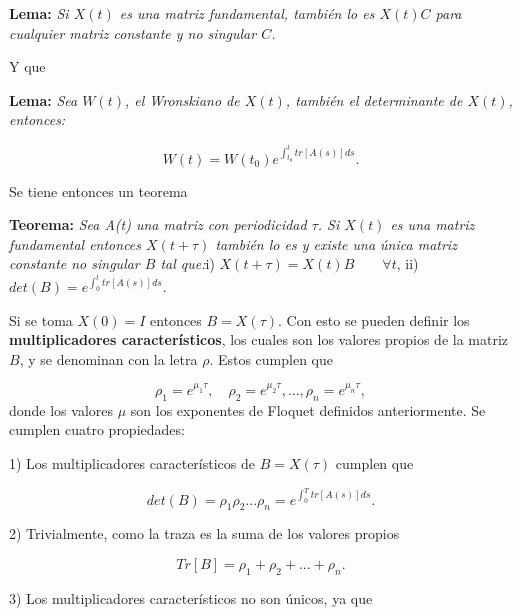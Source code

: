 \documentclass[10pt,a4paper]{report}
\begin{document}
\begin{center}
\textbf{Lema:} \textit{Si $X(t)$ es una matriz fundamental, también lo es $X(t)C$ para cualquier matriz constante y no singular $C$.}
\end{center}Y que

\begin{center}
\textbf{Lema:} \textit{Sea $W(t)$, el Wronskiano de $X(t)$, también el determinante de $X(t)$,
  entonces:}

\begin{equation}
W(t) = W(t_0) e^{\int_{t_0}^{t}tr[A(s)]ds}.
\end{equation}
 
\end{center} Se tiene entonces un teorema

\begin{center}
\textbf{Teorema:} \textit{Sea A(t) una matriz con periodicidad $\tau$.
  Si $X(t)$ es una matriz fundamental entonces $X(t+\tau)$ también lo
  es y existe una única matriz constante no singular $B$ tal
  que:}\linebreak \linebreak i) $X(t+\tau) = X(t)B \qquad\forall t$,
\linebreak ii) $det(B) = e^{\int_0^t tr[A(s)]ds}.$
\end{center}
Si se toma $X(0)=I$ entonces $B=X(\tau)$. Con esto se pueden definir
los \textbf{multiplicadores característicos}, los cuales son los
valores propios de la matriz $B$, y se denominan con la letra $\rho$.
Estos cumplen que

\begin{equation}
\rho_1 = e^{\mu_1 \tau}, \quad \rho_2 = e^{\mu_2 \tau}, ... , \rho_n =
e^{\mu_n \tau},
\end{equation} donde los valores $\mu$ son los exponentes de Floquet definidos anteriormente. Se cumplen cuatro propiedades:

1) Los multiplicadores característicos de $B=X(\tau)$ cumplen que

\begin{equation}
det(B) = \rho_1 \rho_2 ... \rho_n = e^{\int_0^T tr[A(s)]ds}.
\end{equation}

2) Trivialmente, como la traza es la suma de los valores propios

\begin{equation}
Tr[B] = \rho_1 + \rho_2 + ... + \rho_n.
\end{equation}

3) Los multiplicadores característicos no son únicos, ya que
\end{document}

